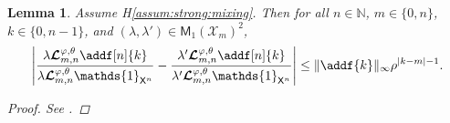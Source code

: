 \documentclass{article}
\newtheorem{lemma}[theorem]{Lemma}
\newcommand{\fk}[2]{\mathbf{F}_{#1 | #2}}
\newcommand{\probmeas}[1]{\mathsf{M}_1(#1)}
\newcommand{\Xfd}{\mathcal{X}}
\newcommand{\precpar}{\varphi}
\newcommand{\intvect}[2]{\{ #1, #2 \}}
\newcommand{\udlow}{\sigma_-}
\newcommand{\udup}{\sigma_+}
\newcommand{\nset}{\mathbb{N}}
\newcommand{\1}{\mathbbm{1}}
\newcommand{\retrokmod}{\boldsymbol{\mathcal{L}}^{\precpar,\theta}}
\newcommand{\uk}[1]{\mathbf{L}_{#1}}
\newcommand{\Xset}{\mathsf{X}}
\newcommand{\bmf}[1]{\set{F}(#1)}
\newcommand{\set}[1]{\mathsf{#1}}
\def\1{\mathds{1}}
\newcommand{\eqdef}{\ensuremath{:=}}
\begin{document}
\begin{lemma} \label{lem:geo:bound}
Assume H\ref{assum:strong:mixing}. Then for all $n \in \nset$, $m \in \intvect{0}{n}$, $k \in \intvect{0}{n - 1}$, and $(\lambda, \lambda') \in \probmeas{\Xfd_m}^2$, 
$$
\left|\frac{\lambda \retrokmod_{m, n} \addf[n]{k}}{\lambda \retrokmod_{m, n} \1_{\Xset^n}} - \frac{\lambda' \retrokmod_{m, n} \addf[n]{k}}{\lambda' \retrokmod_{m, n} \1_{\Xset^n}} \right| \leq \| \addf{k} \|_\infty \rho^{|k - m| - 1}. 
$$
\begin{proof}
See \cite{gloaguen2019pseudo}.
%

\end{proof}
\end{lemma}
\end{document}
